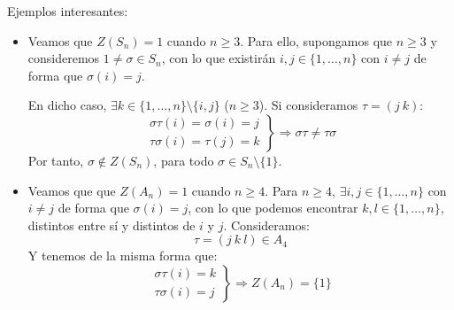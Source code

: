 \begin{ejemplo} %
    Ejemplos interesantes:
    \begin{itemize}
        \item Veamos que $Z(S_n) = 1$ cuando $n\geq 3$. Para ello, supongamos que $n\geq 3$ y consideremos $1\neq \sigma\in S_n$, con lo que existirán $i,j\in \{1,\ldots,n\}$ con $i\neq j$ de forma que $\sigma(i) = j$.

            En dicho caso, $\exists k\in \{1,\ldots,n\}\setminus \{i,j\}$ ($n\geq 3$). Si consideramos $\tau = (j\ k)$:
            \begin{equation*}
                \left.\begin{array}{r}
                    \sigma\tau(i) = \sigma(i) = j \\
                    \tau\sigma(i) = \tau(j) = k
                \end{array}\right\} \Longrightarrow \sigma\tau \neq \tau \sigma
            \end{equation*}
            Por tanto, $\sigma\notin Z(S_n)$, para todo $\sigma\in S_n\setminus\{1\}$.
        \item Veamos que  que $Z(A_n) = 1$ cuando $n\geq 4$. Para $n\geq 4$, $\exists i,j\in \{1,\ldots,n\}$ con $i\neq j$ de forma que $\sigma(i) = j$, con lo que podemos encontrar $k,l\in \{1,\ldots,n\}$, distintos entre sí y distintos de $i$ y $j$. Consideramos:
            \begin{equation*}
                \tau = (j\ k\ l) \in A_4
            \end{equation*}
            Y tenemos de la misma forma que:
            \begin{equation*}
                \left.\begin{array}{r}
                        \sigma\tau(i) = k \\
                        \tau\sigma(i) = j
                \end{array}\right\} \Longrightarrow Z(A_n) = \{1\}
            \end{equation*}
    \end{itemize}
\end{ejemplo}

